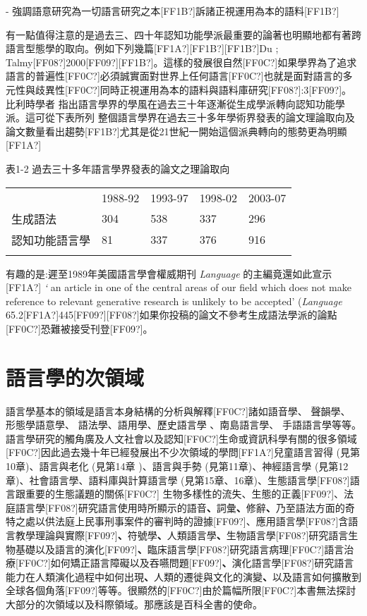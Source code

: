 {}-  強調語意研究為一切語言研究之本[FF1B?]訴諸正視運用為本的語料[FF1B?]

有一點值得注意的是過去三、四十年認知功能學派最重要的論著也明顯地都有著跨語言型態學的取向。例如下列幾篇[FF1A?]\citet{Givon1979}[FF1B?]\citet{HopperThompson1980}[FF1B?]Du \citet{Bois1987}; Talmy[FF08?]2000[FF09?][FF1B?]\citet{Bybee2010}。這樣的發展很自然[FF0C?]如果學界為了追求語言的普遍性[FF0C?]必須誠實面對世界上任何語言[FF0C?]也就是面對語言的多元性與歧異性[FF0C?]同時正視運用為本的語料與語料庫研究[FF08?]\citealt{Langacker1987}:3[FF09?]。比利時學者\citet{Geeraerts2010} 指出語言學界的學風在過去三十年逐漸從生成學派轉向認知功能學派。這可從下表所列 整個語言學界在過去三十多年學術界發表的論文理論取向及論文數量看出趨勢[FF1B?]尤其是從21世紀一開始這個派典轉向的態勢更為明顯[FF1A?]

表1-2  過去三十多年語言學界發表的論文之理論取向

\tablefirsthead{}

\tabletail{}
\tablelasttail{}
\begin{tabularx}{\textwidth}{XXXXX} & 1988-92 & 1993-97 & 1998-02 & 2003-07\\
\lsptoprule
生成語法 & 304 & 538 & 337 & 296\\
認知功能語言學 & 81 & 337 & 376 & 916\\
\lspbottomrule
\end{tabularx}
有趣的是:遲至1989年美國語言學會權威期刊 \textit{Language} 的主編竟還如此宣示[FF1A?] \textit{‘} an article in one of the central areas of our field which does not make reference to relevant generative research is unlikely to be accepted’ (\textit{Language} 65.2[FF1A?]445[FF09?][FF08?]如果你投稿的論文不參考生成語法學派的論點[FF0C?]恐難被接受刊登[FF09?]。

\section{語言學的次領域} %

語言學基本的領域是語言本身結構的分析與解釋[FF0C?]諸如語音學、 聲韻學、 形態學語意學、 語法學、語用學、歷史語言學 、南島語言學、 手語語言學等等。語言學研究的觸角廣及人文社會以及認知[FF0C?]生命或資訊科學有關的很多領域[FF0C?]因此過去幾十年已經發展出不少次領域的學問[FF1A?]兒童語言習得 (見第10章)、語言與老化 (見第14章 )、語言與手勢 (見第11章)、神經語言學 (見第12章)、社會語言學、語料庫與計算語言學 (見第15章、16章)、生態語言學[FF08?]語言跟重要的生態議題的關係[FF0C?] 生物多樣性的流失、生態的正義[FF09?]、法庭語言學[FF08?]研究語言使用時所顯示的語音\textbf{、}詞彙\textbf{、}修辭\textbf{、}乃至語法方面的奇特之處以供法庭上民事刑事案件的審判時的證據[FF09?]、應用語言學[FF08?]含語言教學理論與實際[FF09?]\textbf{、}符號學\textbf{、}人類語言學\textbf{、}生物語言學[FF08?]研究語言生物基礎以及語言的演化[FF09?]\textbf{、}臨床語言學[FF08?]研究語言病理[FF0C?]語言治療[FF0C?]如何矯正語言障礙以及吞嚥問題[FF09?]\textbf{、}演化語言學[FF08?]研究語言能力在人類演化過程中如何出現\textbf{、}人類的遷徙與文化的演變\textbf{、}以及語言如何擴散到全球各個角落[FF09?]等等。很顯然的[FF0C?]由於篇幅所限[FF0C?]本書無法探討大部分的次領域以及科際領域。那應該是百科全書的使命。

